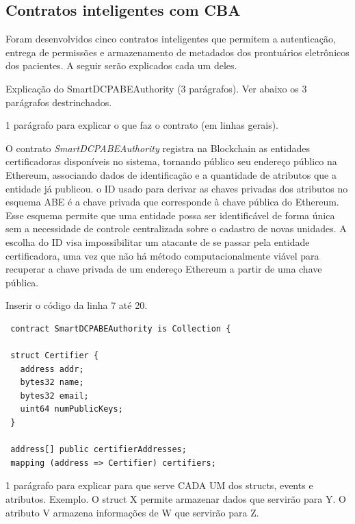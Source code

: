 \documentclass[a4paper,11pt]{article}
\begin{document}
\subsection{Contratos inteligentes com CBA}
\label{sec:sub:ImplementacaoSmartContracts}

Foram desenvolvidos cinco contratos inteligentes que permitem a autenticação, entrega de permissões e armazenamento de metadados dos prontuários eletrônicos dos pacientes.
A seguir serão explicados cada um deles.

{\color{ForestGreen} Explicação do  SmartDCPABEAuthority (3 parágrafos). Ver abaixo os 3 parágrafos destrinchados.}

{\color{Magenta} 1 parágrafo para explicar o que faz o contrato (em linhas gerais).}

O contrato \emph{SmartDCPABEAuthority} registra na Blockchain as entidades certificadoras disponíveis no sistema, tornando público seu endereço público na Ethereum, associando dados de identificação e a quantidade de atributos que a entidade já publicou.
o ID usado para derivar as chaves privadas dos atributos no esquema ABE é a chave privada que corresponde à chave pública do Ethereum.
Esse esquema permite que uma entidade possa ser identificável de forma única sem a necessidade de controle centralizada sobre o cadastro de novas unidades.
A escolha do ID visa impossibilitar um atacante de se passar pela entidade certificadora, uma vez que não há método computacionalmente viável para recuperar a chave privada de um endereço Ethereum a partir de uma chave pública.

{\color{Magenta} Inserir o código da linha 7 até 20.}

\begin{lstlisting}
 contract SmartDCPABEAuthority is Collection {

 struct Certifier {
   address addr;
   bytes32 name;
   bytes32 email;
   uint64 numPublicKeys;
 }

 address[] public certifierAddresses;
 mapping (address => Certifier) certifiers;
\end{lstlisting}

{\color{Magenta} 1 parágrafo para explicar para que serve CADA UM dos structs, events e atributos. Exemplo. O struct X permite armazenar dados que servirão para Y. O atributo V armazena informações de W que servirão para Z.}
\end{document}
